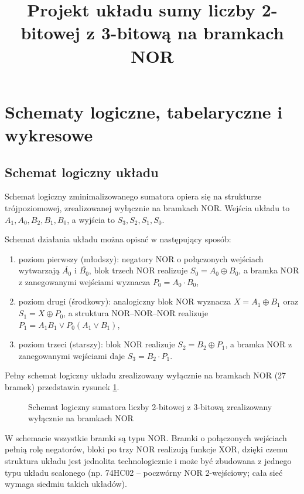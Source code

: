 \documentclass[11pt]{article}
\title{Projekt układu sumy liczby 2-bitowej z 3-bitową na bramkach NOR}
\author{}
\date{}
\begin{document}
\maketitle

\section{Schematy logiczne, tabelaryczne i wykresowe}

\subsection{Schemat logiczny układu}

Schemat logiczny zminimalizowanego sumatora opiera się na strukturze trójpoziomowej, zrealizowanej wyłącznie na bramkach NOR. Wejścia układu to \(A_1, A_0, B_2, B_1, B_0\), a wyjścia to \(S_3, S_2, S_1, S_0\).

Schemat działania układu można opisać w następujący sposób:
\begin{enumerate}
    \item poziom pierwszy (młodszy): negatory NOR o połączonych wejściach wytwarzają \(\overline{A_0}\) i \(\overline{B_0}\), blok trzech NOR realizuje \(S_0 = A_0 \oplus B_0\), a bramka NOR z zanegowanymi wejściami wyznacza \(P_0 = A_0 \cdot B_0\),
    \item poziom drugi (środkowy): analogiczny blok NOR wyznacza \(X = A_1 \oplus B_1\) oraz \(S_1 = X \oplus P_0\), a struktura NOR--NOR--NOR realizuje \(P_1 = A_1B_1 \lor P_0(A_1 \lor B_1)\),
    \item poziom trzeci (starszy): blok NOR realizuje \(S_2 = B_2 \oplus P_1\), a bramka NOR z zanegowanymi wejściami daje \(S_3 = B_2 \cdot P_1\).
\end{enumerate}

Pełny schemat logiczny układu zrealizowany wyłącznie na bramkach NOR (27 bramek) przedstawia rysunek \ref{fig:schemat_log}.

\begin{figure}[!htb]
\centering
\resizebox{0.62\linewidth}{!}{\RysSchematNOR}
\caption{Schemat logiczny sumatora liczby 2-bitowej z 3-bitową zrealizowany wyłącznie na bramkach NOR}
\label{fig:schemat_log}
\end{figure}

W schemacie wszystkie bramki są typu NOR. Bramki o połączonych wejściach pełnią rolę negatorów, bloki po trzy NOR realizują funkcje XOR, dzięki czemu struktura układu jest jednolita technologicznie i może być zbudowana z jednego typu układu scalonego (np. 74HC02 -- poczwórny NOR 2-wejściowy; cała sieć wymaga siedmiu takich układów).
\end{document}
